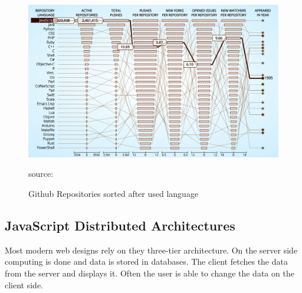 \begin{figure}
	\centering
	\includegraphics[scale=0.5]{bilder/grundlagen/jsUsage.png}
	\caption{Github Repositories sorted after used language} source:\cite{JS}
	\label{fig:JS}
\end{figure}

\newpage

\subsection{JavaScript Distributed Architectures}
Most modern web designs rely on they three-tier architecture. On the server side computing is done and data is stored in databases. The client fetches the data from the server and displays it. Often the user is able to change the data on the client side. 

